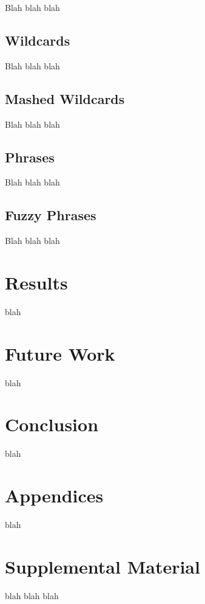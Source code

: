 \documentclass[11pt,a4paper]{article}
\begin{document}
Blah blah blah

\subsection{Wildcards}

Blah blah blah

\subsection{Mashed Wildcards}

Blah blah blah

\subsection{Phrases}

Blah blah blah

\subsection{Fuzzy Phrases}

Blah blah blah

\section{Results}

blah

\section{Future Work}

blah

\section{Conclusion}

blah




\appendix

\section{Appendices}
\label{sec:appendix}

blah 

\section{Supplemental Material}
\label{sec:supplemental}
blah blah blah
\end{document}
